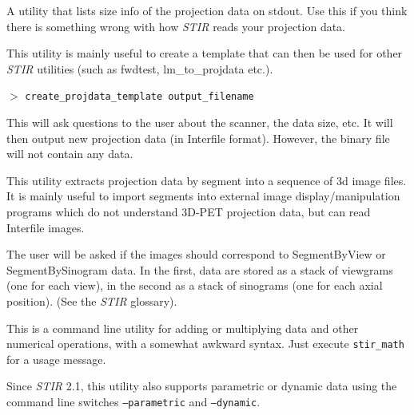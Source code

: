 \documentclass{article}
\newcommand{\cmdline}[1]{\par \noindent $>$ \texttt{#1}\par}
\begin{document}
A utility that lists size info of the projection data on stdout. 
Use this if you think there is something wrong with how \textit{STIR} 
reads your projection data.

{ 
}

This utility is mainly useful to create a template that can then 
be used for other \textit{STIR} utilities (such as fwdtest, lm\_to\_projdata 
etc.).
\cmdline{create\_projdata\_template output\_filename}

This will ask questions to the user about the scanner, the data 
size, etc. It will then output new projection data (in Interfile 
format). However, the binary file will not contain any data.

{ 
}

This utility extracts projection data by segment into a sequence 
of 3d image files. It is mainly useful to import segments into 
external image display/manipulation programs which do not understand 
3D-PET projection data, but can read Interfile images.


The user will be asked if the images should correspond to SegmentByView 
or SegmentBySinogram data. In the first, data are stored as a 
stack of viewgrams (one for each view), in the second as a stack 
of sinograms (one for each axial position). (See the \textit{STIR} glossary).

{ 
}
\label{sec:stir_math}

This is a command line utility for adding or multiplying data 
and other numerical operations, with a somewhat awkward syntax. 
Just execute \texttt{stir\_math} for a usage message.

Since \textit{STIR} 2.1, this utility also supports parametric or dynamic data using
the command line switches \texttt{--parametric} and \texttt{--dynamic}.
\end{document}
